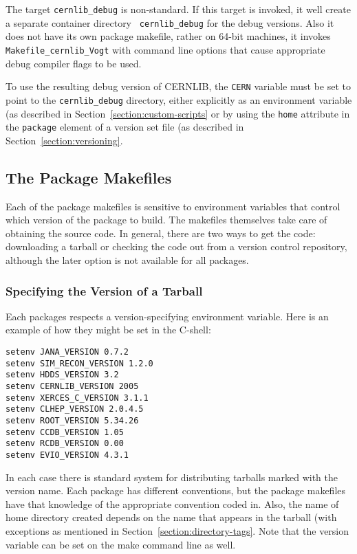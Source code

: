 \documentclass[12pt, letterpaper]{article}
\begin{document}
The target {\tt cernlib\_debug} is non-standard. If this target is
invoked, it well create a separate container directory {\tt
  cernlib\_debug} for the debug versions. Also it does not have its
own package makefile, rather on 64-bit machines, it invokes {\tt
  Makefile\_cernlib\_Vogt} with command line options that cause
appropriate debug compiler flags to be used.

To use the resulting debug version of CERNLIB, the {\tt CERN} variable
must be set to point to the {\tt cernlib\_debug} directory, either explicitly as an environment variable (as described in Section~\ref{section:custom-scripts} or by using the {\tt home} attribute in the {\tt package} element of a version set file (as described in Section~\ref{section:versioning}.

\subsection{The Package Makefiles}\label{section:package-makefiles}

Each of the package makefiles is sensitive to environment variables
that control which version of the package to build. The makefiles
themselves take care of obtaining the source code. In general, there
are two ways to get the code: downloading a tarball or checking the
code out from a version control repository, although the later option
is not available for all packages.

\subsubsection{Specifying the Version of a Tarball}

Each packages respects a version-specifying environment variable. Here
is an example of how they might be set in the C-shell:

\begin{verbatim}
setenv JANA_VERSION 0.7.2
setenv SIM_RECON_VERSION 1.2.0
setenv HDDS_VERSION 3.2
setenv CERNLIB_VERSION 2005
setenv XERCES_C_VERSION 3.1.1
setenv CLHEP_VERSION 2.0.4.5
setenv ROOT_VERSION 5.34.26
setenv CCDB_VERSION 1.05
setenv RCDB_VERSION 0.00
setenv EVIO_VERSION 4.3.1
\end{verbatim}

In each case there is standard system for distributing tarballs marked
with the version name. Each package has different conventions, but the
package makefiles have that knowledge of the appropriate convention
coded in. Also, the name of home directory created depends on the name
that appears in the tarball (with exceptions as mentioned in
Section~\ref{section:directory-tags}. Note that the version variable
can be set on the make command line as well.
\end{document}
